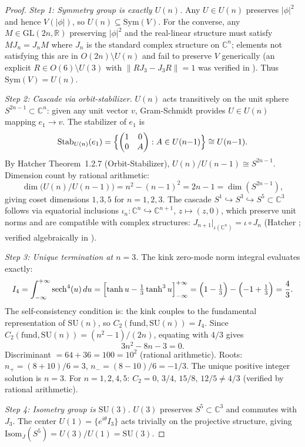 \documentclass[11pt,a4paper]{article}
\begin{document}
\begin{proof}
\textit{Step 1: Symmetry group is exactly $U(n)$.}
Any $U \in U(n)$ preserves $|\phi|^2$ and hence $V(|\phi|)$, so
$U(n) \subseteq \mathrm{Sym}(V)$.
For the converse, any $M \in \mathrm{GL}(2n,\mathbb{R})$ preserving $|\phi|^2$
and the real-linear structure must satisfy $MJ_n = J_nM$ where $J_n$ is the
standard complex structure on $\mathbb{C}^n$; elements not satisfying this
are in $O(2n)\setminus U(n)$ and fail to preserve $V$ generically (an explicit
$R \in O(6)\setminus U(3)$ with $\|RJ_3 - J_3R\| = 1$ was verified in
\cite[C305]{DFC}).  Thus $\mathrm{Sym}(V) = U(n)$.

\textit{Step 2: Cascade via orbit-stabilizer.}
$U(n)$ acts transitively on the unit sphere $S^{2n-1} \subset \mathbb{C}^n$:
given any unit vector $v$, Gram-Schmidt provides $U \in U(n)$ mapping $e_1 \to v$.
The stabilizer of $e_1$ is
\[
  \mathrm{Stab}_{U(n)}(e_1) = \Bigl\{\begin{pmatrix}1&0\\0&A\end{pmatrix} :
  A \in U(n{-}1)\Bigr\} \cong U(n{-}1).
\]
By Hatcher \cite{Hat02} Theorem~1.2.7 (Orbit-Stabilizer),
$U(n)/U(n-1) \cong S^{2n-1}$.
Dimension count by rational arithmetic:
\[
  \dim\bigl(U(n)/U(n-1)\bigr) = n^2 - (n-1)^2 = 2n-1 = \dim(S^{2n-1}),
\]
giving coset dimensions $1, 3, 5$ for $n = 1, 2, 3$.
The cascade $S^1 \hookrightarrow S^3 \hookrightarrow S^5 \subset \mathbb{C}^3$
follows via equatorial inclusions $\iota_n: \mathbb{C}^n \hookrightarrow \mathbb{C}^{n+1}$,
$z \mapsto (z, 0)$, which preserve unit norms and are compatible with
complex structures: $J_{n+1}\big|_{\iota(\mathbb{C}^n)} = \iota \circ J_n$
(Hatcher \cite{Hat02}; verified algebraically in \cite[C310]{DFC}).

\textit{Step 3: Unique termination at $n = 3$.}
The kink zero-mode norm integral evaluates exactly:
\[
  I_4 = \int_{-\infty}^{+\infty} \mathrm{sech}^4(u)\,du
  = \Bigl[\tanh u - \tfrac{1}{3}\tanh^3 u\Bigr]_{-\infty}^{+\infty}
  = \Bigl(1 - \tfrac{1}{3}\Bigr) - \Bigl(-1 + \tfrac{1}{3}\Bigr) = \frac{4}{3}.
\]
The self-consistency condition is: the kink couples to the fundamental representation
of $\mathrm{SU}(n)$, so $C_2(\mathrm{fund},\mathrm{SU}(n)) = I_4$.
Since $C_2(\mathrm{fund},\mathrm{SU}(n)) = (n^2-1)/(2n)$, equating with $4/3$ gives
\[
  3n^2 - 8n - 3 = 0.
\]
Discriminant $= 64 + 36 = 100 = 10^2$ (rational arithmetic).
Roots: $n_+ = (8+10)/6 = 3$, $n_- = (8-10)/6 = -1/3$.
The unique positive integer solution is $\boxed{n = 3}$.
For $n = 1, 2, 4, 5$: $C_2 = 0,\, 3/4,\, 15/8,\, 12/5 \neq 4/3$
(verified by rational arithmetic).

\textit{Step 4: Isometry group is $\mathrm{SU}(3)$.}
$U(3)$ preserves $S^5 \subset \mathbb{C}^3$ and commutes with $J_3$.
The center $U(1) = \{e^{i\theta}I_3\}$ acts trivially on the projective
structure, giving $\mathrm{Isom}_J(S^5) = U(3)/U(1) = \mathrm{SU}(3)$.
\end{proof}
\end{document}
